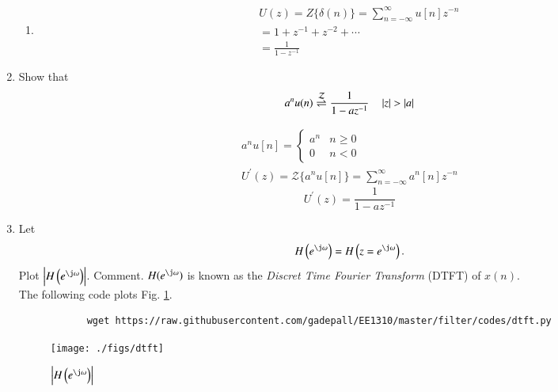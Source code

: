\documentclass[journal,12pt,twocolumn]{IEEEtran}
\renewcommand\thesection{\arabic{section}}
\begin{document}
\begin{enumerate}[label=\thesection.\arabic*]
\begin{enumerate}[label=(\roman*)]
			\item \solution \begin{align}
				U(z) = Z\{\delta(n)\}=\sum_{n=-\infty}^{\infty} u[n] z^{-n} \\
				=1+z^{-1}+z^{-2}+\cdots \\
				=\frac{1}{1-z^{-1}}
			\end{align}
		\end{enumerate}
		
		\item Show that 
		\begin{equation}
			\label{eq:anun}
			a^nu(n) \overset{\mathcal{Z}}{ \rightleftharpoons} \frac{1}{1-az^{-1}} \quad \left\vert z\right\vert > \left\vert a\right\vert
		\end{equation}
		
		\solution
		\begin{align}
			a^{n}u[n] = \begin{cases} a^{n} & n \geq 0 \\
				0 & n<0\end{cases} \\
			U^{\prime}(z)={\mathcal{Z}}\{a^{n}u[n]\}=\sum_{n=-\infty}^{\infty} a^{n}[n] z^{-n}
		\end{align}
		\begin{equation}
			\label{eq:U'}
			U^{\prime}(z)=\frac{1}{1-a z^{-1}}
		\end{equation}
		
		
		\item 
		Let
		\begin{equation}
			H\brak{e^{\j \omega}} = H\brak{z = e^{\j \omega}}.
		\end{equation}
		Plot $\abs{H\brak{e^{\j \omega}}}$.  Comment.  $H(e^{\j \omega})$ is
		known as the {\em Discret Time Fourier Transform} (DTFT) of $x(n)$.
		\\
		\solution The following code plots Fig. \ref{fig:dtft}.
		\begin{lstlisting}
			wget https://raw.githubusercontent.com/gadepall/EE1310/master/filter/codes/dtft.py
		\end{lstlisting}
		\begin{figure}[!ht]
			\centering
			\texttt{[image: ./figs/dtft]}
			\caption{$\abs{H\brak{e^{\j\omega}}}$}
			\label{fig:dtft}
		\end{figure}
	\end{enumerate}
	
\end{document}
